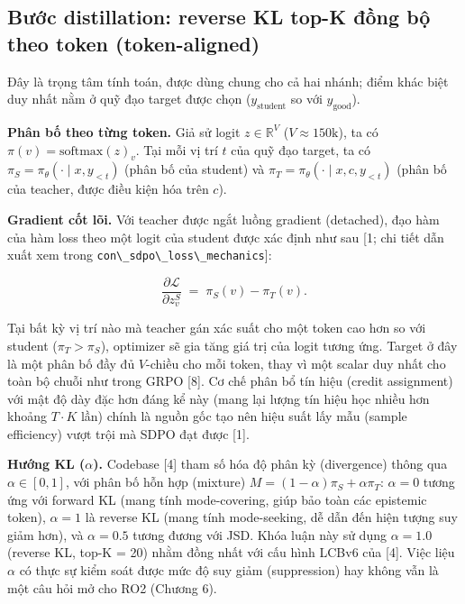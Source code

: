 \subsection{Bước distillation: reverse KL top-K đồng bộ theo token (token-aligned)}\label{the-distillation-step-token-aligned-top-k-reverse-kl}

Đây là trọng tâm tính toán, được dùng chung cho cả hai nhánh; điểm khác biệt duy nhất nằm ở quỹ đạo target được chọn (\(y_{\text{student}}\) so với \(y_{\text{good}}\)).

\textbf{Phân bố theo từng token.} Giả sử logit \(z \in \mathbb{R}^V\) (\(V \approx 150\text{k}\)), ta có \(\pi(v) = \mathrm{softmax}(z)_v\). Tại mỗi vị trí \(t\) của quỹ đạo target, ta có \(\pi_S = \pi_\theta(\cdot\mid x, y_{<t})\) (phân bố của student) và \(\pi_T = \pi_\theta(\cdot \mid x, c, y_{<t})\) (phân bố của teacher, được điều kiện hóa trên \(c\)).

\textbf{Gradient cốt lõi.} Với teacher được ngắt luồng gradient (detached), đạo hàm của hàm loss theo một logit của student được xác định như sau {[}1; chi tiết dẫn xuất xem trong \passthrough{\lstinline!con\_sdpo\_loss\_mechanics!}{]}:

\[
\frac{\partial \mathcal{L}}{\partial z_v^{S}} \;=\; \pi_S(v) - \pi_T(v).
\]

Tại bất kỳ vị trí nào mà teacher gán xác suất cho một token cao hơn so với student (\(\pi_T > \pi_S\)), optimizer sẽ gia tăng giá trị của logit tương ứng. Target ở đây là một phân bố đầy đủ \(V\)-chiều cho mỗi token, thay vì một scalar duy nhất cho toàn bộ chuỗi như trong GRPO {[}8{]}. Cơ chế phân bổ tín hiệu (credit assignment) với mật độ dày đặc hơn đáng kể này (mang lại lượng tín hiệu học nhiều hơn khoảng \(T \cdot K\) lần) chính là nguồn gốc tạo nên hiệu suất lấy mẫu (sample efficiency) vượt trội mà SDPO đạt được {[}1{]}.

\textbf{Hướng KL (\(\alpha\)).} Codebase {[}4{]} tham số hóa độ phân kỳ (divergence) thông qua \(\alpha \in [0,1]\), với phân bố hỗn hợp (mixture) \(M = (1-\alpha)\pi_S + \alpha\pi_T\): \(\alpha = 0\) tương ứng với forward KL (mang tính mode-covering, giúp bảo toàn các epistemic token), \(\alpha = 1\) là reverse KL (mang tính mode-seeking, dễ dẫn đến hiện tượng suy giảm hơn), và \(\alpha = 0.5\) tương đương với JSD. Khóa luận này sử dụng \(\alpha = 1.0\) (reverse KL, top-K = 20) nhằm đồng nhất với cấu hình LCBv6 của {[}4{]}. Việc liệu \(\alpha\) có thực sự kiểm soát được mức độ suy giảm (suppression) hay không vẫn là một câu hỏi mở cho RO2 (Chương 6).

